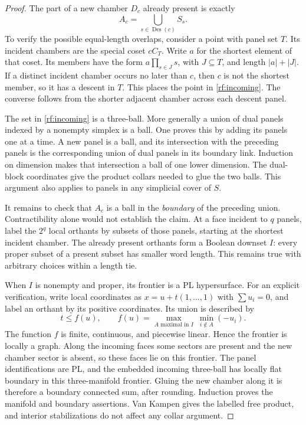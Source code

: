 \documentclass[11pt]{article}
\theoremstyle{definition}
\theoremstyle{remark}
\begin{document}
\begin{proof}
The part of a new chamber $D_c$ already present is exactly
\begin{equation}
 \label{rf:incoming}
 A_c=\bigcup_{s\in\operatorname{Des}(c)}S_s.
\end{equation}
To verify the possible equal-length overlaps, consider a point with
panel set $T$.  Its incident chambers are the special coset $cC_T$.
Write $a$ for the shortest element of that coset.  Its members have
the form $a\prod_{s\in J}s$, with $J\subseteq T$, and length
$|a|+|J|$.  If a distinct incident chamber occurs no later than $c$,
then $c$ is not the shortest member, so it has a descent in $T$.
This places the point in \eqref{rf:incoming}.  The converse follows
from the shorter adjacent chamber across each descent panel.

The set in \eqref{rf:incoming} is a three-ball.  More generally a union
of dual panels indexed by a nonempty simplex is a ball.  One proves
this by adding its panels one at a time.  A new panel is a ball, and
its intersection with the preceding panels is the corresponding union
of dual panels in its boundary link.  Induction on dimension makes
that intersection a ball of one lower dimension.  The dual-block
coordinates give the product collars needed to glue the two balls.
This argument also applies to panels in any simplicial cover of $S$.

It remains to check that $A_c$ is a ball in the \emph{boundary} of the
preceding union.  Contractibility alone would not establish the claim.
At a face incident to $q$ panels, label the $2^q$ local orthants by
subsets of those panels, starting at the shortest incident chamber.
The already present orthants form a Boolean downset $I$: every proper
subset of a present subset has smaller word length.  This remains true
with arbitrary choices within a length tie.

When $I$ is nonempty and proper, its frontier is a PL hypersurface.
For an explicit verification, write local coordinates as
$x=u+t(1,\ldots,1)$ with $\sum u_i=0$, and label an orthant by its
positive coordinates.  Its union is described by
\[
 t\leq f(u),\qquad
 f(u)=\max_{A\text{ maximal in }I}\ 
               \min_{i\notin A}(-u_i).
\]
The function $f$ is finite, continuous, and piecewise linear.  Hence
the frontier is locally a graph.  Along the incoming faces some sectors
are present and the new chamber sector is absent, so these faces lie
on this frontier.  The panel identifications are PL, and the embedded
incoming three-ball has locally flat boundary in this three-manifold
frontier.  Gluing the new chamber along it is therefore a boundary
connected sum, after rounding.  Induction proves the manifold and
boundary assertions.  Van Kampen gives the labelled free product,
and interior stabilizations do not affect any collar argument.
\end{proof}
\end{document}
